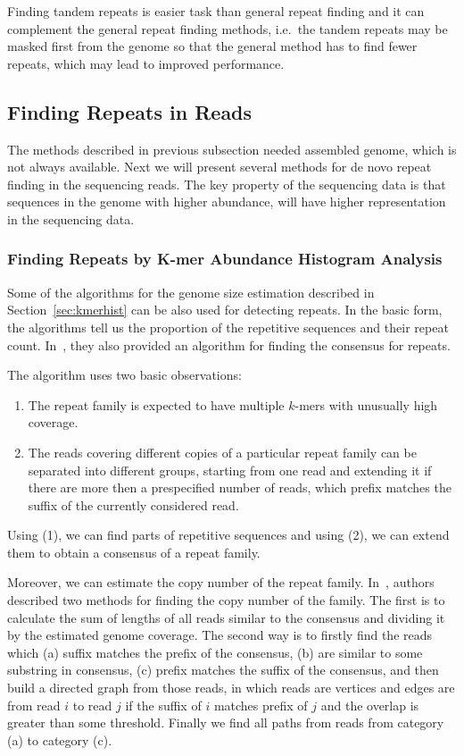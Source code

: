 Finding tandem repeats is easier task than general repeat finding and it can complement the general repeat finding methods, i.e.\ the tandem repeats may be masked first from the genome so that the general method has to find fewer repeats, which may lead to improved performance.

\subsection{Finding Repeats in Reads}\label{sect:repeats-reads}

The methods described in previous subsection needed assembled genome, which is not always available. Next we will present several methods for de novo repeat finding in the sequencing reads. The key property of the sequencing data is that sequences in the genome with higher abundance, will have higher representation in the sequencing data.

\subsubsection{Finding Repeats by K-mer Abundance Histogram Analysis}

Some of the algorithms for the genome size estimation described in Section~\ref{sec:kmerhist} can be also used for detecting repeats.
In the basic form, the algorithms tell us the proportion of the repetitive sequences and their repeat count. In~\cite{waterman}, they also provided an algorithm for finding the consensus for repeats.

The algorithm uses two basic observations:
\begin{reformulate*}
\begin{enumerate}
  \item The repeat family is expected to have multiple $k$-mers with  unusually high coverage.
  \item The reads covering different copies of a particular repeat family can be separated into different groups, starting from one read and extending it if there are more then a prespecified number of reads, which prefix matches the suffix of the currently considered read.
\end{enumerate}
\end{reformulate*}
Using (1), we can find parts of repetitive sequences and using (2), we can extend them to obtain a consensus of a repeat family.

Moreover, we can estimate the copy number of the repeat family. In~\cite{waterman}, authors described two methods for finding the copy number of the family.
The first is to calculate the sum of lengths of all reads similar to the consensus and dividing it by the estimated genome coverage.
The second way is to firstly find the reads which (a) suffix matches the prefix of the consensus, (b) are similar to some substring in consensus, (c) prefix matches the suffix of the consensus, and then build a directed graph from those reads, in which reads are vertices and edges are from read $i$ to read $j$ if the suffix of $i$ matches prefix of $j$ and the overlap is greater than some threshold. Finally we find all paths from reads from category (a) to category (c).

